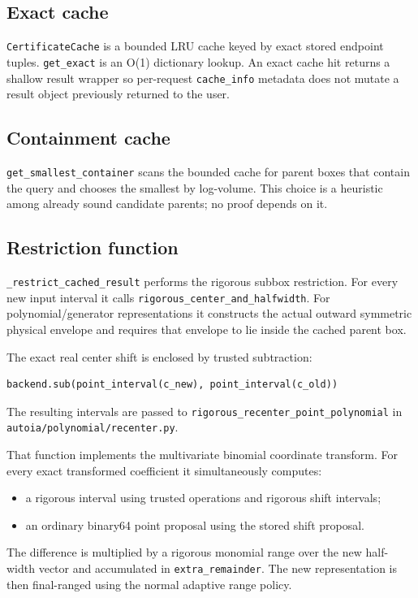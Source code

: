 \documentclass[11pt]{article}
\newcommand{\codepath}[1]{\nolinkurl{#1}}
\begin{document}
\subsection{Exact cache}

\texttt{CertificateCache} is a bounded LRU cache keyed by exact stored endpoint
tuples.  \texttt{get\_exact} is an O(1) dictionary lookup.  An exact cache hit
returns a shallow result wrapper so per-request \texttt{cache\_info} metadata
does not mutate a result object previously returned to the user.

\subsection{Containment cache}

\texttt{get\_smallest\_container} scans the bounded cache for parent boxes that
contain the query and chooses the smallest by log-volume.  This choice is a
heuristic among already sound candidate parents; no proof depends on it.

\subsection{Restriction function}

\texttt{\_restrict\_cached\_result} performs the rigorous subbox restriction.
For every new input interval it calls
\texttt{rigorous\_center\_and\_halfwidth}.  For polynomial/generator
representations it constructs the actual outward symmetric physical envelope and
requires that envelope to lie inside the cached parent box.

The exact real center shift is enclosed by trusted subtraction:
\begin{lstlisting}[language=Python]
backend.sub(point_interval(c_new), point_interval(c_old))
\end{lstlisting}
The resulting intervals are passed to
\texttt{rigorous\_recenter\_point\_polynomial} in
\codepath{autoia/polynomial/recenter.py}.

That function implements the multivariate binomial coordinate transform.  For
every exact transformed coefficient it simultaneously computes:
\begin{itemize}[leftmargin=*]
\item a rigorous interval using trusted operations and rigorous shift intervals;
\item an ordinary binary64 point proposal using the stored shift proposal.
\end{itemize}
The difference is multiplied by a rigorous monomial range over the new half-width
vector and accumulated in \texttt{extra\_remainder}.  The new representation is
then final-ranged using the normal adaptive range policy.
\end{document}

